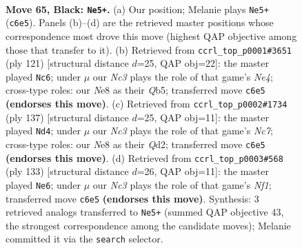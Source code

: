\documentclass[11pt]{article}
\begin{document}
\clearpage

\begin{figure}[p]\centering
\begin{subfigure}{0.46\textwidth}\centering
\resizebox{\linewidth}{!}{%
\newchessgame
\chessboard[
  setfen={3kn3/1Q6/P1n3K1/8/8/8/3N3q/8 b - - 2 65},
  showmover=false,
  pgfstyle=straightmove, color=movearrow, markmove={c6-e5}
]}
\caption{}
\end{subfigure}\hfill
\begin{subfigure}{0.46\textwidth}\centering
\resizebox{\linewidth}{!}{%
\newchessgame
\chessboard[
  setfen={8/8/4k3/1q2n3/3Q4/4P3/8/3K4 b - - 9 61},
  showmover=false,
  pgfstyle=straightmove, color=movearrow, markmove={e5-c6}
]}
\caption{}
\end{subfigure}
\\[4pt]
\begin{subfigure}{0.46\textwidth}\centering
\resizebox{\linewidth}{!}{%
\newchessgame
\chessboard[
  setfen={8/8/1k6/8/Q7/8/KPnq4/8 b - - 17 69},
  showmover=false,
  pgfstyle=straightmove, color=movearrow, markmove={c2-d4}
]}
\caption{}
\end{subfigure}\hfill
\begin{subfigure}{0.46\textwidth}\centering
\resizebox{\linewidth}{!}{%
\newchessgame
\chessboard[
  setfen={5nk1/8/8/3q3P/5Q2/7K/6N1/8 b - - 0 67},
  showmover=false,
  pgfstyle=straightmove, color=movearrow, markmove={f8-e6}
]}
\caption{}
\end{subfigure}
\caption{\textbf{Move 65, Black: \texttt{Ne5+}.} (a) Our position; Melanie plays \texttt{Ne5+} (\texttt{c6e5}). Panels (b)--(d) are the retrieved master positions whose correspondence most drove this move (highest QAP objective among those that transfer to it). (b) Retrieved from \texttt{ccrl\_top\_p0001\#3651} (ply 121) [structural distance $d$=25, QAP obj=22]: the master played \texttt{Nc6}; under $\mu$ our \emph{Nc3} plays the role of that game's \emph{Ne4}; cross-type roles: our \emph{N}e8 as their \emph{Q}b5; transferred move \texttt{c6e5} \textbf{(endorses this move)}. (c) Retrieved from \texttt{ccrl\_top\_p0002\#1734} (ply 137) [structural distance $d$=25, QAP obj=11]: the master played \texttt{Nd4}; under $\mu$ our \emph{Nc3} plays the role of that game's \emph{Nc7}; cross-type roles: our \emph{N}e8 as their \emph{Q}d2; transferred move \texttt{c6e5} \textbf{(endorses this move)}. (d) Retrieved from \texttt{ccrl\_top\_p0003\#568} (ply 133) [structural distance $d$=26, QAP obj=11]: the master played \texttt{Ne6}; under $\mu$ our \emph{Nc3} plays the role of that game's \emph{Nf1}; transferred move \texttt{c6e5} \textbf{(endorses this move)}. Synthesis: 3 retrieved analogs transferred to \texttt{Ne5+} (summed QAP objective 43, the strongest correspondence among the candidate moves); Melanie committed it via the \texttt{search} selector.}
\label{fig:thought-m129}
\end{figure}
\end{document}
